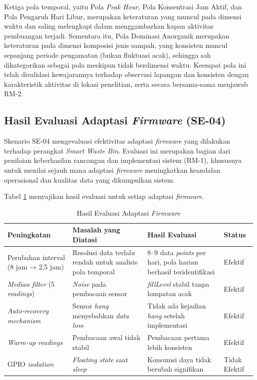 Ketiga pola temporal, yaitu Pola \textit{Peak Hour}, Pola Konsentrasi Jam Aktif, dan Pola Pengaruh Hari Libur, merupakan keteraturan yang muncul pada dimensi waktu dan saling melengkapi dalam menggambarkan kapan aktivitas pembuangan terjadi. Sementara itu, Pola Dominasi Anorganik merupakan keteraturan pada dimensi komposisi jenis sampah, yang konsisten muncul sepanjang periode pengamatan (bukan fluktuasi acak), sehingga sah dikategorikan sebagai pola meskipun tidak berdimensi waktu. Keempat pola ini telah divalidasi kewajarannya terhadap observasi lapangan dan konsisten dengan karakteristik aktivitas di lokasi penelitian, serta secara bersama-sama menjawab RM-2.

\subsection{Hasil Evaluasi Adaptasi \textit{Firmware} (SE-04)}

Skenario SE-04 mengevaluasi efektivitas adaptasi \textit{firmware} yang dilakukan terhadap perangkat \textit{Smart Waste Bin}. Evaluasi ini merupakan bagian dari penilaian keberhasilan rancangan dan implementasi sistem (RM-1), khususnya untuk menilai sejauh mana adaptasi \textit{firmware} meningkatkan keandalan operasional dan kualitas data yang dikumpulkan sistem.

Tabel \ref{tab:hasil-firmware} menyajikan hasil evaluasi untuk setiap adaptasi \textit{firmware}.

\begin{table}[H]
  \caption{Hasil Evaluasi Adaptasi \textit{Firmware}}
  \label{tab:hasil-firmware}
  \begin{tabularx}{\textwidth}{| X | X | X | l |}
    \hline
    \textbf{Peningkatan} & \textbf{Masalah yang Diatasi} & \textbf{Hasil Evaluasi} & \textbf{Status} \\
    \hline
    Perubahan interval (8 jam → 2,5 jam) & Resolusi data terlalu rendah untuk analisis pola temporal & 8--9 data \textit{points} per hari, pola harian berhasil teridentifikasi & Efektif \\
    \hline
    \textit{Median filter} (5 \textit{readings}) & \textit{Noise} pada pembacaan sensor & \textit{fillLevel} stabil tanpa lompatan acak & Efektif \\
    \hline
    \textit{Auto-recovery mechanism} & Sensor \textit{hang} menyebabkan \textit{data loss} & Tidak ada kejadian \textit{hang} setelah implementasi & Efektif \\
    \hline
    \textit{Warm-up readings} & Pembacaan awal tidak stabil & Pembacaan pertama lebih konsisten & Efektif \\
    \hline
    GPIO \textit{isolation} & \textit{Floating state} saat \textit{sleep} & Konsumsi daya tidak berubah signifikan & Tidak Efektif \\
    \hline
  \end{tabularx}
\end{table}

